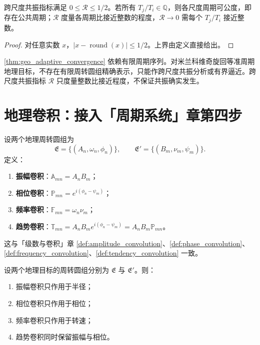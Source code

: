 \begin{proposition}[跨尺度共振指标的界]\label{prop:geo_cross_scale_bound}
跨尺度共振指标满足 $0\le\mathcal R\le 1/2$。若所有 $T_j/T_i\in\mathbb Q$，则各尺度周期可公度，即存在公共周期；$\mathcal R$ 度量各周期比接近整数的程度，$\mathcal R\to0$ 需每个 $T_j/T_i$ 接近整数。
\end{proposition}

\begin{proof}
对任意实数 $x$，$|x-\operatorname{round}(x)|\le 1/2$。上界由定义直接给出。
\end{proof}

\begin{remark}[动态调节的边界]\label{rem:geo_adaptive_boundary}
\cref{thm:geo_adaptive_convergence} 依赖有限周期序列。对米兰科维奇旋回等准周期地理目标，不存在有限周转圆组精确表示，只能作跨尺度共振分析或有界逼近。跨尺度共振指标 $\mathcal R$ 只度量整数比接近程度，不保证共振确实发生。
\end{remark}

\section{地理卷积：接入「周期系统」章第四步}
\label{sec:geo_convolution}

\begin{definition}\label{def:geo_convolution_types}
设两个地理周转圆组为
\[
\mathfrak E=\{(A_n,\omega_n,\phi_n)\},\qquad
\mathfrak E'=\{(B_m,\nu_m,\psi_m)\}.
\]
定义：
\begin{enumerate}[label=(\roman*)]
    \item \textbf{振幅卷积}：$\mathbb A_{mn}=A_nB_m$；
    \item \textbf{相位卷积}：$\mathbb P_{mn}=e^{i(\phi_n-\psi_m)}$；
    \item \textbf{频率卷积}：$\mathbb F_{mn}=\omega_n\nu_m$；
    \item \textbf{趋势卷积}：$\mathbb T_{mn}=A_nB_m e^{i(\phi_n-\psi_m)}=A_nB_m\mathbb P_{mn}$。
\end{enumerate}
这与「级数与卷积」章 \cref{def:amplitude_convolution}、\cref{def:phase_convolution}、\cref{def:frequency_convolution}、\cref{def:tendency_convolution} 一致。
\end{definition}

\begin{theorem}[三类卷积在地理周转圆组上的作用]\label{thm:geo_convolution_action}
设两个地理目标的周转圆组分别为 $\mathfrak E$ 与 $\mathfrak E'$。则：
\begin{enumerate}[label=(\roman*)]
    \item 振幅卷积只作用于半径；
    \item 相位卷积只作用于相位；
    \item 频率卷积只作用于转速；
    \item 趋势卷积同时保留振幅与相位。
\end{enumerate}
\end{theorem}

